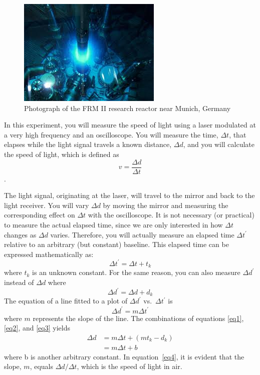 \begin{figure}
\centering
\includegraphics{../images/cherenkov.jpg}
\caption{Photograph of the FRM II research reactor near Munich, Germany}
\end{figure}


In this experiment, you will measure the speed of light using a laser 
modulated at a very high frequency and an oscilloscope. You will 
measure the time, $\Delta t$, that elapses while the light signal travels a 
known distance, $\Delta d$, and you will calculate the speed of light, which is 
defined as 
\[
v = \frac{\Delta d}{\Delta t}
\]. 

The light signal, originating at the laser, will travel to the mirror and 
back to the light receiver. You will vary $\Delta d$ by moving the mirror and 
measuring the corresponding effect on $\Delta t$ with the oscilloscope.
It is not necessary (or practical) to measure the actual elapsed time, 
since we are only interested in how $\Delta t$ changes as $\Delta d$ varies. 
Therefore, you will actually measure an elapsed time $\Delta t^\prime$ relative to an 
arbitrary (but constant) baseline. This elapsed time can be expressed 
mathematically as:
\begin{equation}
\label{eq1}
\Delta t^\prime = \Delta t + t_k
\end{equation}
where $t_k$ is an unknown constant. For the same reason, you can also 
measure $\Delta d^\prime$ instead of $\Delta d$ where
\begin{equation}
\label{eq2}
\Delta d^\prime = \Delta d + d_k
\end{equation}
The equation of a line fitted to a plot of $\Delta d^\prime$ vs.\ $\Delta t^\prime$ is 
\begin{equation}
\label{eq3}
\Delta d^\prime = m \Delta t^\prime
\end{equation}
where $m$ represents the slope of the line. The combinations of 
equations \ref{eq1}, \ref{eq2}, and \ref{eq3} yields
\begin{align}
\label{eq4}
\Delta d & = m \Delta t + \left( m t_k - d_k \right) \nonumber \\
               & = m \Delta t + b 
\end{align}
where b is another arbitrary constant. In equation~\ref{eq4}, it is evident that 
the slope, $m$, equals $\Delta d/\Delta t$, which is the speed of light in air.

